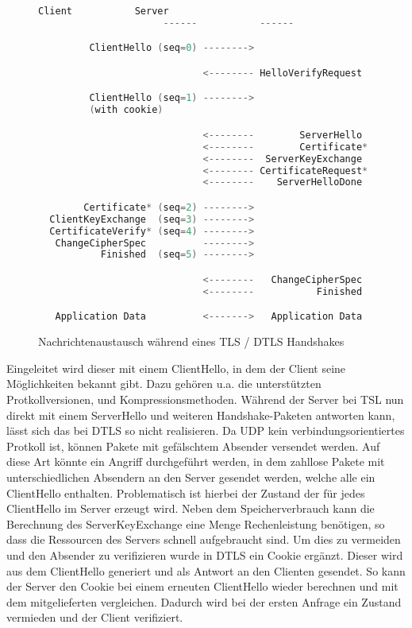 \begin{figure}[ht]
  \centering
  \begin{lstlisting}[language=c]
                      Client           Server
                      ------           ------

         ClientHello (seq=0) -------->

                             <-------- HelloVerifyRequest  (seq=0)    // Nur bei DTLS

         ClientHello (seq=1) -------->                                // Nur bei DTLS
         (with cookie)                                                // Nur bei DTLS

                             <--------        ServerHello  (seq=1)
                             <--------        Certificate* (seq=2)
                             <--------  ServerKeyExchange  (seq=3)
                             <-------- CertificateRequest* (seq=4)
                             <--------    ServerHelloDone  (seq=5)

        Certificate* (seq=2) -------->
  ClientKeyExchange  (seq=3) -------->
  CertificateVerify* (seq=4) -------->
   ChangeCipherSpec          -------->
           Finished  (seq=5) -------->

                             <--------   ChangeCipherSpec
                             <--------           Finished  (seq=6)

   Application Data          <------->   Application Data
  \end{lstlisting}
  \caption{Nachrichtenaustausch während eines TLS / DTLS Handshakes}
  \label{fig:handshake}
\end{figure}

Eingeleitet wird dieser mit einem ClientHello, in dem der Client seine Möglichkeiten bekannt gibt. Dazu gehören u.a. die unterstützten Protkollversionen, 
und Kompressionsmethoden. Während der Server bei TSL nun direkt mit einem ServerHello und weiteren Handshake-Paketen antworten kann, lässt sich das bei DTLS so nicht
realisieren. Da UDP kein verbindungsorientiertes Protkoll ist, können Pakete mit gefälschtem Absender versendet werden. Auf diese Art könnte ein  Angriff
durchgeführt werden, in dem zahllose Pakete mit unterschiedlichen Absendern an den Server gesendet werden, welche alle ein ClientHello enthalten. Problematisch ist
hierbei der Zustand der für jedes ClientHello im Server erzeugt wird. Neben dem Speicherverbrauch kann die Berechnung des ServerKeyExchange eine Menge Rechenleistung
benötigen, so dass die Ressourcen des Servers schnell aufgebraucht sind. Um dies zu vermeiden und den Absender zu verifizieren wurde in DTLS ein Cookie ergänzt.
Dieser wird aus dem ClientHello generiert und als Antwort an den Clienten gesendet. So kann der Server den Cookie bei einem erneuten ClientHello wieder berechnen
und mit dem mitgelieferten vergleichen. Dadurch wird bei der ersten Anfrage ein Zustand vermieden und der Client verifiziert.

